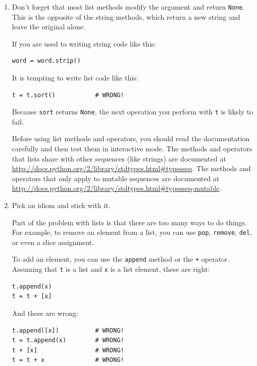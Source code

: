 \documentclass[10pt]{book}
\begin{document}
\begin{enumerate}

\item Don't forget that most list methods modify the argument and
  return {\tt None}.  This is the opposite of the string methods,
  which return a new string and leave the original alone.

If you are used to writing string code like this:

\begin{verbatim}
word = word.strip()
\end{verbatim}

It is tempting to write list code like this:

\begin{verbatim}
t = t.sort()           # WRONG!
\end{verbatim}

Because {\tt sort} returns {\tt None}, the
next operation you perform with {\tt t} is likely to fail.

Before using list methods and operators, you should read the
documentation carefully and then test them in interactive mode.  The
methods and operators that lists share with other sequences (like
strings) are documented at
\url{http://docs.python.org/2/library/stdtypes.html#typesseq}.  The
methods and operators that only apply to mutable sequences
are documented at \url{http://docs.python.org/2/library/stdtypes.html#typesseq-mutable}.


\item Pick an idiom and stick with it.

Part of the problem with lists is that there are too many
ways to do things.  For example, to remove an element from
a list, you can use {\tt pop}, {\tt remove}, {\tt del},
or even a slice assignment.

To add an element, you can use the {\tt append} method or
the {\tt +} operator.  Assuming that {\tt t} is a list and
{\tt x} is a list element, these are right: 

\begin{verbatim}
t.append(x)
t = t + [x]
\end{verbatim}

And these are wrong:

\begin{verbatim}
t.append([x])          # WRONG!
t = t.append(x)        # WRONG!
t + [x]                # WRONG!
t = t + x              # WRONG!
\end{verbatim}


\end{enumerate}
\end{document}
